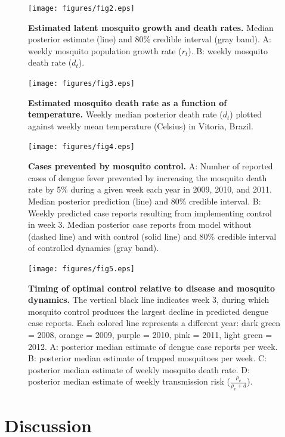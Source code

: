 \documentclass[10pt,letterpaper]{article}
\begin{document}
\begin{figure}[!h]
\texttt{[image: figures/fig2.eps]}
\caption{{\bf Estimated latent mosquito growth and death rates.}
Median posterior estimate (line) and 80\% credible interval (gray band).  A: weekly mosquito population growth rate ($r_t$). B: weekly mosquito death rate ($d_t$).
}
\label{latent}
\end{figure}

\begin{figure}[!h]
\texttt{[image: figures/fig3.eps]}
\caption{{\bf Estimated mosquito death rate as a function of temperature.}
Weekly median posterior death rate ($d_t$) plotted against weekly mean temperature (Celsius) in Vitoria, Brazil.
}
\label{temp}
\end{figure}

\begin{figure}[!h]
\texttt{[image: figures/fig4.eps]}
\caption{{\bf Cases prevented by mosquito control.}
A: Number of reported cases of dengue fever prevented by increasing the mosquito death rate by 5\% during a given week each year in 2009, 2010, and 2011. Median posterior prediction (line) and 80\% credible interval. B: Weekly predicted case reports resulting from implementing control in week 3.  Median posterior case reports from model without (dashed line) and with control (solid line) and 80\% credible interval of controlled dynamics (gray band).
}
\label{control}
\end{figure}

\begin{figure}[!h]
\texttt{[image: figures/fig5.eps]}
\caption{{\bf Timing of optimal control relative to disease and mosquito dynamics.}
The vertical black line indicates week 3, during which mosquito control produces the largest decline in predicted dengue case reports. Each colored line represents a different year: dark green = 2008, orange = 2009, purple = 2010, pink = 2011, light green = 2012. A: posterior median estimate of dengue case reports per week. B: posterior median estimate of trapped mosquitoes per week. C: posterior median estimate of weekly mosquito death rate. D: posterior median estimate of weekly transmission risk ($\frac{\rho_v}{\rho_v + d}$).
}
\label{timing}
\end{figure}

\section*{Discussion}
\end{document}
